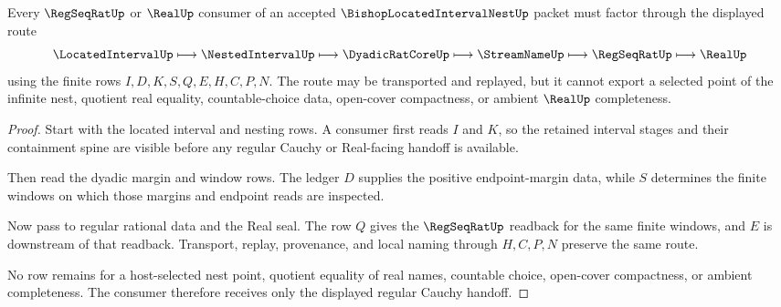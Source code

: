 \begin{theorem}
\label{thm:bishop-located-interval-nest-regular-cauchy-consumer}
Every $\RegSeqRatUp$ or $\RealUp$ consumer of an accepted $\BishopLocatedIntervalNestUp$ packet must factor through the displayed route
$$
\LocatedIntervalUp \longmapsto \NestedIntervalUp \longmapsto \DyadicRatCoreUp \longmapsto \StreamNameUp \longmapsto \RegSeqRatUp \longmapsto \RealUp
$$
using the finite rows $I,D,K,S,Q,E,H,C,P,N$. The route may be transported and replayed, but it cannot export a selected point of the infinite nest, quotient real equality, countable-choice data, open-cover compactness, or ambient $\RealUp$ completeness.
\end{theorem}
\begin{proof}
Start with the located interval and nesting rows. A consumer first reads $I$ and $K$, so the retained interval stages and their containment spine are visible before any regular Cauchy or Real-facing handoff is available.

Then read the dyadic margin and window rows. The ledger $D$ supplies the positive endpoint-margin data, while $S$ determines the finite windows on which those margins and endpoint reads are inspected.

Now pass to regular rational data and the Real seal. The row $Q$ gives the $\RegSeqRatUp$ readback for the same finite windows, and $E$ is downstream of that readback. Transport, replay, provenance, and local naming through $H,C,P,N$ preserve the same route.

No row remains for a host-selected nest point, quotient equality of real names, countable choice, open-cover compactness, or ambient completeness. The consumer therefore receives only the displayed regular Cauchy handoff.
\end{proof}


\begin{closurestatus}{\BishopLocatedIntervalNestUp}
  \theoryclosure{\seedClosure}
  \formalstatus{\unformalizedV}
\end{closurestatus}
